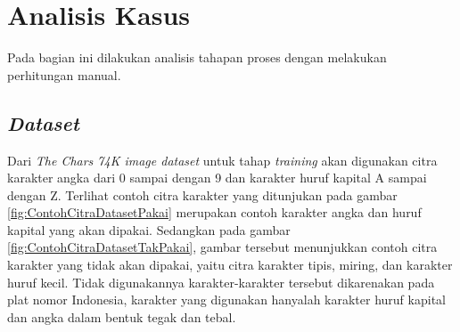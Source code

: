 
\section{Analisis Kasus}
\noindent Pada bagian ini dilakukan analisis tahapan proses dengan melakukan perhitungan manual.\\

\subsection{\textit{Dataset}}
\noindent Dari \textit{The Chars 74K image dataset} untuk tahap \textit{training} akan digunakan citra karakter angka dari 0 sampai dengan 9 dan karakter huruf kapital A sampai dengan Z. Terlihat contoh citra karakter yang ditunjukan pada gambar \ref{fig:ContohCitraDatasetPakai} merupakan contoh karakter angka dan huruf kapital yang akan dipakai. Sedangkan pada gambar \ref{fig:ContohCitraDatasetTakPakai}, gambar tersebut menunjukkan contoh citra karakter yang tidak akan dipakai, yaitu citra karakter tipis, miring, dan karakter huruf kecil. Tidak digunakannya karakter-karakter tersebut dikarenakan pada plat nomor Indonesia, karakter yang digunakan hanyalah karakter huruf kapital dan angka dalam bentuk tegak dan tebal.

